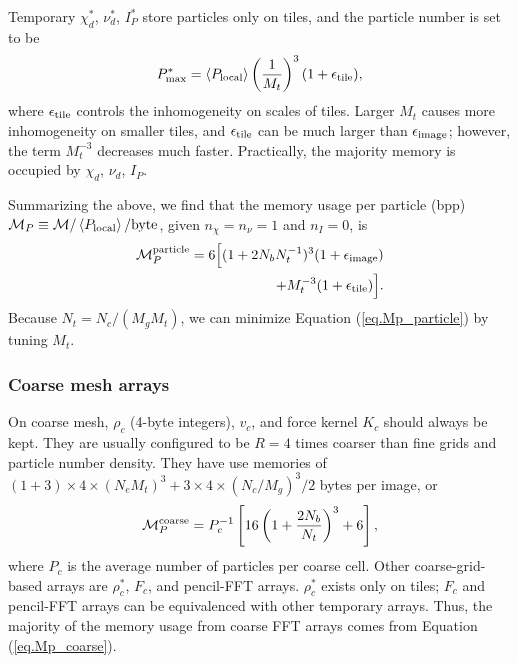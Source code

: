 \documentclass[10pt,twocolumn,preprint]{emulateapj}
\begin{document}
Temporary $\chi_d^*$, $\nu_d^*$, $I_P^*$ store particles only on tiles, and the particle number is set to be
\begin{equation}\label{eq.nptile}
	P_{\rm max}^*=\left\langle P_{\rm local} \right\rangle \left( \frac{1}{M_t} \right)^3(1+\epsilon_{\rm tile}),
\end{equation}
where $\epsilon_{\rm tile}$ controls the inhomogeneity on scales of tiles. Larger $M_t$ causes more inhomogeneity on smaller tiles, and $\epsilon_{\rm tile}$ can be much larger than $\epsilon_{\rm image}$; however, the term $M_t^{-3}$ decreases much faster. Practically, the majority memory is occupied by $\chi_d$, $\nu_d$, $I_P$.

Summarizing the above, we find that the memory usage per particle (bpp) ${\mathcal M}_P \equiv {\mathcal M} / \left\langle P_{\rm local} \right\rangle/{\rm byte}$, given $n_\chi=n_\nu=1$ and $n_I=0$, is
\begin{eqnarray}\label{eq.Mp_particle}
\nonumber\mathcal{M}_P^{\rm particle}=6\Big [ (1+2N_b N_t^{-1})^3(1+\epsilon_{\rm image} )\\
	+M_t^{-3}(1+\epsilon_{\rm tile})\Big ].
\end{eqnarray}
Because $N_t=N_c/(M_g M_t)$, we can minimize Equation (\ref{eq.Mp_particle}) by tuning $M_t$.

\subsubsection{Coarse mesh arrays}
On coarse mesh, $\rho_c$ (4-byte integers), $v_c$, and force kernel $K_c$ should always be kept. They are usually configured to be $R=4$ times coarser than fine grids and particle number density. They have use memories of $(1+3)\times 4\times(N_e M_t)^3+3\times 4\times(N_c/M_g)^3/2$ bytes per image, or
\begin{equation}\label{eq.Mp_coarse}
	\mathcal{M}_P^{\rm coarse}=P_c^{-1} \left [ 16\left( 1+\frac{2N_b}{N_t} \right)^3+6 \right ],
\end{equation}
where $P_c$ is the average number of particles per coarse cell. Other coarse-grid-based arrays are $\rho_c^*$, $F_c$, and pencil-FFT arrays. $\rho_c^*$ exists only on tiles; $F_c$ and pencil-FFT arrays can be equivalenced with other temporary arrays. Thus, the majority of the memory usage from coarse FFT arrays comes from Equation (\ref{eq.Mp_coarse}).
\end{document}
